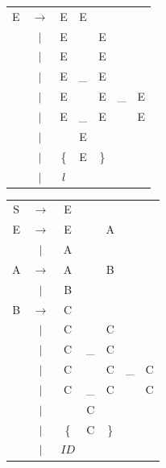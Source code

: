 \documentclass[a4paper, 10pt, twoside]{article}
\begin{document}
\begin{table}[H]
\begin{tabular} {c c c c c c c}

E & $\rightarrow$ & E & E                 &   & & \\
  & $|$           & E & \detokenize{/}    & E & & \\
  & $|$           & E & \detokenize{^}    & E & & \\
  & $|$           & E & \_                & E & & \\
  & $|$           & E & \detokenize{^}    & E & \_  & E \\
  & $|$           & E & \_                & E & \detokenize{^} & E \\
  & $|$           & \detokenize{(}        & E & \detokenize{)} & & \\
  & $|$           & \{                    & E & \} & & \\
  & $|$           & $l$ & & & & \\
\end{tabular}
\quad \quad \quad \quad \quad \quad \quad \quad \quad \quad
\begin{tabular} {c c c c c c c}

S & $\rightarrow$ & E &                   &   & & \\
E & $\rightarrow$ & E & \detokenize{/}    & A & & \\
  & $|$           & A &                   &   & & \\
A & $\rightarrow$ & A &                   & B & & \\
  & $|$           & B &                   &   & & \\
B & $\rightarrow$ & C &                   &   & & \\
  & $|$           & C & \detokenize{^}    & C & & \\
  & $|$           & C & \_                & C & & \\
  & $|$           & C & \detokenize{^}    & C & \_  & C \\
  & $|$           & C & \_                & C & \detokenize{^} & C \\
  & $|$           & \detokenize{(}        & C & \detokenize{)} & & \\
  & $|$           & \{                    & C & \} & & \\
  & $|$           & $ID$                  & & & & \\

\end{tabular}
\end{table}
\end{document}
